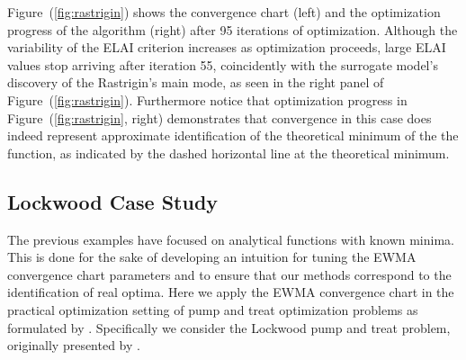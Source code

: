\documentclass[12pt]{article}
\begin{document}
%
%

%
Figure~(\ref{fig:rastrigin}) shows the convergence chart (left) and the optimization progress of the algorithm (right) after 95 iterations of optimization.
%
Although the variability of the ELAI criterion increases as optimization proceeds, large ELAI values stop arriving after iteration 55, coincidently with the surrogate model's discovery of the Rastrigin's main mode, as seen in the right panel of Figure~(\ref{fig:rastrigin}).
%
Furthermore notice that optimization progress in Figure~(\ref{fig:rastrigin}, right) demonstrates that convergence in this case does indeed represent approximate identification of the theoretical minimum of the the function, as indicated by the dashed horizontal line at the theoretical minimum. 


%
%
%


%
%
\subsection{Lockwood Case Study}
\label{sec:lockwood}
%
%

The previous examples have focused on analytical functions with known minima.
%
This is done for the sake of developing an intuition for tuning the EWMA convergence chart parameters and to ensure that our methods correspond to the identification of real optima.
Here we apply the EWMA convergence chart in the practical optimization setting of pump and treat optimization problems as formulated by \cite{mayer2002optimal}.
%
Specifically we consider the Lockwood pump and treat problem, originally presented by \cite{lockCite}. %
\end{document}
